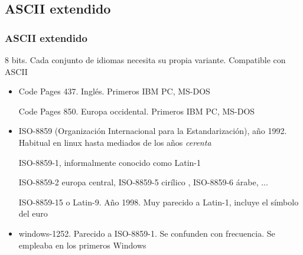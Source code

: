 \documentclass[ucs]{beamer}
\begin{document}
\subsection{ASCII extendido}
\begin{frame}[fragile]
\frametitle{ASCII extendido}
8 bits.  Cada conjunto
de idiomas necesita su propia variante. Compatible con ASCII
\begin{itemize}	
\item 
Code Pages 437. Inglés. Primeros IBM PC, MS-DOS

Code Pages 850. Europa occidental. Primeros IBM PC, MS-DOS
\item 
ISO-8859 (Organización Internacional para la Estandarización), año 1992. 
Habitual en linux hasta mediados de los años \emph{cerenta}

ISO-8859-1, informalmente conocido como Latin-1

ISO-8859-2 europa central, ISO-8859-5 cirílico , ISO-8859-6 árabe, ...

ISO-8859-15 o Latin-9. Año 1998. Muy parecido a Latin-1, incluye
el símbolo del euro
\item
windows-1252. Parecido a ISO-8859-1. Se confunden con frecuencia. 
Se empleaba en los primeros Windows
\end{itemize}
\end{frame}




\end{document}
